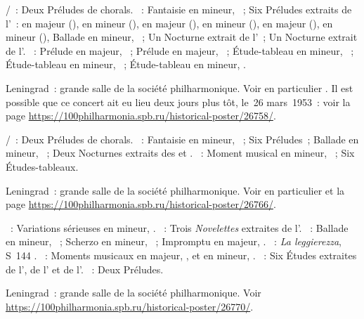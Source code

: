 \begin{description}
 \textsc{\JBach{}/\Busoni{}}~: Deux Préludes de chorals.
 \textsc{\Chopin{}}~: Fantaisie en \kF mineur, ~; Six Préludes
 extraits de l'~: en \kF \Sharp majeur (), en \kE \Flat
 mineur (), en \kD \Flat majeur (), en \kB \Flat
 mineur (), en \kA \Flat majeur (), en \kF mineur
 (), Ballade en \kF mineur, ~; Un Nocturne extrait de
 l'~; Un Nocturne extrait de l'.
 \textsc{\Rachmaninov{}}~: Prélude en \kD majeur,  ~;
 Prélude en \kG majeur,  ~; Étude-tableau en \kE \Flat
 mineur,  ~; Étude-tableau en \kG mineur, 
 ~; Étude-tableau en \kC \Sharp mineur,  .
 \item[\DateWithWeekDay{1953-03-28}]
 Leningrad~: grande salle de la société philharmonique.
 Voir en particulier \citet[p.~444]{Milshteyn82a}.
 Il est possible que ce concert ait eu lieu deux jours plus tôt, le~26
 mars~1953~: voir la page
 \href{https://100philharmonia.spb.ru/historical-poster/26758/}%
 {https://100philharmonia.spb.ru/historical-poster/26758/}.

 \textsc{\JBach{}/\Busoni{}}~: Deux Préludes de chorals.
 \textsc{\Chopin{}}~: Fantaisie en \kF mineur, ~; Six Préludes~;
 Ballade en \kF mineur, ~; Deux Nocturnes extraits des  et
 .
 \textsc{\Rachmaninov{}}~: Moment musical en \kB mineur, 
 ~; Six Études-tableaux.
 \item[\DateWithWeekDay{1953-03-30}]
 Leningrad~: grande salle de la société philharmonique.
 Voir en particulier \citet[p.~444]{Milshteyn82a} et la page
 \href{https://100philharmonia.spb.ru/historical-poster/26766/}%
 {https://100philharmonia.spb.ru/historical-poster/26766/}.

 \textsc{\Mendelssohn{}}~: Variations sérieuses en \kD mineur, .
 \textsc{\Schumann{}}~: Trois \emph{Novelettes} extraites de l'.
 \textsc{\Chopin{}}~: Ballade en \kG mineur, ~; Scherzo en \kB
 \Flat mineur, ~; Impromptu en \kG \Flat majeur, .
 \textsc{\Liszt{}}~: \emph{La leggierezza}, S~144 .
 \textsc{\Rachmaninov{}}~: Moments musicaux en \kD \Flat majeur, 
 , et en \kE \Flat mineur,  .
 \textsc{\Scriabine{}}~: Six Études extraites de l', de l'
 et de l'.
 \textsc{\Liadov{}}~: Deux Préludes.
 \item[\DateWithWeekDay{1953-04-03}]
 Leningrad~: grande salle de la société philharmonique.
 Voir \href{https://100philharmonia.spb.ru/historical-poster/26770/}%
 {https://100philharmonia.spb.ru/historical-poster/26770/}.


\end{description}

